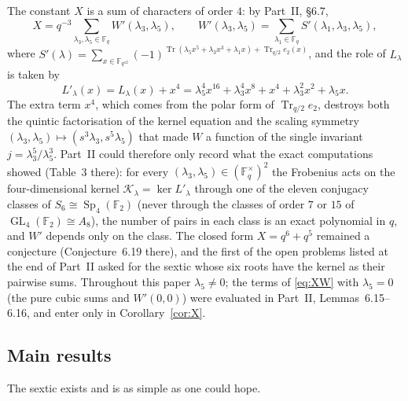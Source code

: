 ﻿\documentclass[12pt,a4paper]{amsart}
\theoremstyle{definition}
\newcommand{\F}{\mathbb{F}}
\newcommand{\Tr}{\operatorname{Tr}}
\newcommand{\Sp}{\operatorname{Sp}}
\newcommand{\GL}{\operatorname{GL}}
\newcommand{\Kk}{\mathcal{K}}
\begin{document}
The constant $X$ is a sum of characters of order $4$: by Part~II, \S6.7,
\begin{equation}\label{eq:XW}
X=q^{-3}\sum_{\lambda_3,\lambda_5\in\F_q}W'(\lambda_3,\lambda_5),\qquad W'(\lambda_3,\lambda_5)=\sum_{\lambda_1\in\F_q}S'(\lambda_1,\lambda_3,\lambda_5),
\end{equation}
where $S'(\lambda)=\sum_{x\in\F_{q^{12}}}(-1)^{\Tr(\lambda_5x^5+\lambda_3x^3+\lambda_1x)+\Tr_{q/2}e_2(x)}$, and the role of $L_\lambda$ is taken by
\begin{equation}\label{eq:Lp}
L'_\lambda(x)=L_\lambda(x)+x^4=\lambda_5^4x^{16}+\lambda_3^4x^8+x^4+\lambda_3^2x^2+\lambda_5x .
\end{equation}
The extra term $x^4$, which comes from the polar form of $\Tr_{q/2}e_2$, destroys both the quintic factorisation of the kernel equation and the scaling symmetry $(\lambda_3,\lambda_5)\mapsto(s^3\lambda_3,s^5\lambda_5)$ that made $W$ a function of the single invariant $j=\lambda_3^5/\lambda_5^3$. Part~II could therefore only record what the exact computations showed (Table~3 there): for every $(\lambda_3,\lambda_5)\in(\F_q^\times)^2$ the Frobenius acts on the four-dimensional kernel $\Kk_\lambda=\ker L'_\lambda$ through one of the eleven conjugacy classes of $S_6\cong\Sp_4(\F_2)$ (never through the classes of order $7$ or $15$ of $\GL_4(\F_2)\cong A_8$), the number of pairs in each class is an exact polynomial in $q$, and $W'$ depends only on the class. The closed form $X=q^6+q^5$ remained a conjecture (Conjecture~6.19 there), and the first of the open problems listed at the end of Part~II asked for the sextic whose six roots have the kernel as their pairwise sums. Throughout this paper $\lambda_5\ne0$; the terms of \eqref{eq:XW} with $\lambda_5=0$ (the pure cubic sums and $W'(0,0)$) were evaluated in Part~II, Lemmas~6.15--6.16, and enter only in Corollary~\ref{cor:X}.

\subsection{Main results}
The sextic exists and is as simple as one could hope.
\end{document}
